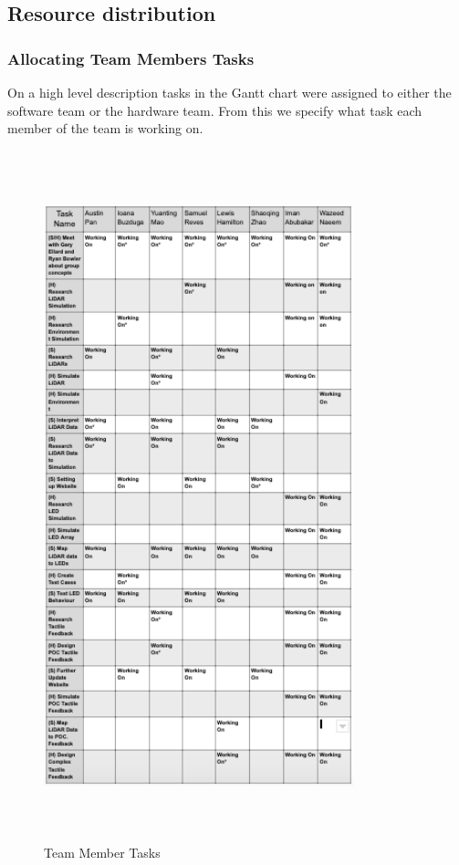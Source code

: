 \documentclass{article}
\begin{document}
\subsection{Resource distribution}
\subsubsection{Allocating Team Members Tasks}
On a high level description tasks in the Gantt chart were assigned to either the software team or the hardware team. From this we specify what task each member of the team is working on.

 \begin{figure}[h]
 \begin{center}
  \includegraphics[width=0.8\textwidth,height=20cm]{TeamMember.png}
   
   \end{center}
  \caption{Team Member Tasks}
\end{figure}
\end{document}
